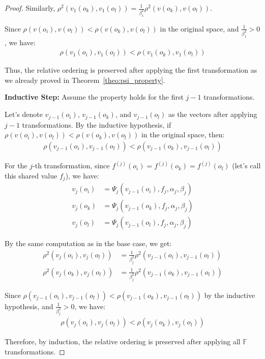 \documentclass[numbers,sort]{article}
\begin{document}
\begin{proof}
Similarly, $\rho^2(v_1(o_k), v_1(o_l)) = \frac{1}{\beta_1^2} \rho^2(v(o_k), v(o_l))$.

Since $\rho(v(o_i), v(o_l)) < \rho(v(o_k), v(o_l))$ in the original space, and $\frac{1}{\beta_1^2} > 0$, we have:
\begin{align}
\rho(v_1(o_i), v_1(o_l)) < \rho(v_1(o_k), v_1(o_l))
\end{align}

Thus, the relative ordering is preserved after applying the first transformation as we already proved in Theorem~\ref{theo:psi_property}.

\noindent\textbf{Inductive Step:} Assume the property holds for the first $j-1$ transformations.

Let's denote $v_{j-1}(o_i)$, $v_{j-1}(o_k)$, and $v_{j-1}(o_l)$ as the vectors after applying $j-1$ transformations. By the inductive hypothesis, if $\rho(v(o_i), v(o_l)) < \rho(v(o_k), v(o_l))$ in the original space, then:
\begin{align}
\rho(v_{j-1}(o_i), v_{j-1}(o_l)) < \rho(v_{j-1}(o_k), v_{j-1}(o_l))
\end{align}

For the $j$-th transformation, since $f^{(j)}(o_i) = f^{(j)}(o_k) = f^{(j)}(o_l)$ (let's call this shared value $f_j$), we have:
\begin{align}
v_j(o_i) &= \Psi_j(v_{j-1}(o_i), f_j, \alpha_j, \beta_j) \\
v_j(o_k) &= \Psi_j(v_{j-1}(o_k), f_j, \alpha_j, \beta_j) \\
v_j(o_l) &= \Psi_j(v_{j-1}(o_l), f_j, \alpha_j, \beta_j)
\end{align}

By the same computation as in the base case, we get:
\begin{align}
\rho^2(v_j(o_i), v_j(o_l)) &= \frac{1}{\beta_j^2} \rho^2(v_{j-1}(o_i), v_{j-1}(o_l)) \\
\rho^2(v_j(o_k), v_j(o_l)) &= \frac{1}{\beta_j^2} \rho^2(v_{j-1}(o_k), v_{j-1}(o_l))
\end{align}

Since $\rho(v_{j-1}(o_i), v_{j-1}(o_l)) < \rho(v_{j-1}(o_k), v_{j-1}(o_l))$ by the inductive hypothesis, and $\frac{1}{\beta_j^2} > 0$, we have:
\begin{align}
\rho(v_j(o_i), v_j(o_l)) < \rho(v_j(o_k), v_j(o_l))
\end{align}

Therefore, by induction, the relative ordering is preserved after applying all $\mathbb{F}$ transformations.
\end{proof}
\end{document}
